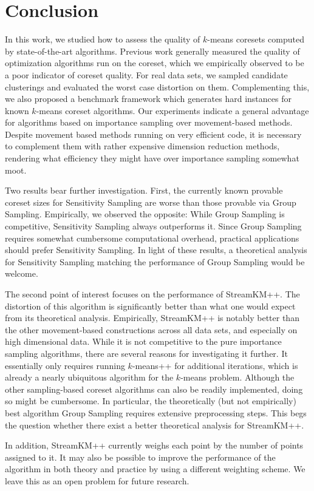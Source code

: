 \section{Conclusion} \label{sec:conclusion}
In this work, we studied how to assess the quality of $k$-means coresets computed by state-of-the-art algorithms. 
Previous work generally measured the quality of optimization algorithms run on the coreset, which we empirically observed to be a poor indicator of coreset quality.
For real data sets, we sampled candidate clusterings and evaluated the worst case distortion on them. Complementing this, we also proposed a benchmark framework which generates hard instances for known $k$-means coreset algorithms. Our experiments indicate a general advantage for algorithms based on importance sampling over movement-based methods. Despite movement based methods running on very efficient code, it is necessary to complement them with rather expensive dimension reduction methods, rendering what efficiency they might have over importance sampling somewhat moot.

Two results bear further investigation. First, the currently known provable coreset sizes for Sensitivity Sampling are worse than those provable via Group Sampling. Empirically, we observed the opposite: While Group Sampling is competitive, Sensitivity Sampling always outperforms it. Since Group Sampling requires somewhat cumbersome computational overhead, practical applications should prefer Sensitivity Sampling. In light of these results, a theoretical analysis for Sensitivity Sampling matching the performance of Group Sampling would be welcome.

The second point of interest focuses on the performance of StreamKM++. The distortion of this algorithm is significantly better than what one would expect from its theoretical analysis.
Empirically, StreamKM++ is notably better than the other movement-based constructions across all data sets, and especially on high dimensional data.
While it is not competitive to the pure importance sampling algorithms, there are several reasons for investigating it further. It essentially only requires running $k$-means++ for additional iterations, which is already a nearly ubiquitous algorithm for the $k$-means problem. Although the other sampling-based coreset algorithms can also be readily implemented, doing so might be cumbersome. In particular, the theoretically (but not empirically) best algorithm Group Sampling requires extensive preprocessing steps.
This begs the question whether there exist a better theoretical analysis for StreamKM++.

In addition, StreamKM++ currently weighs each point by the number of points assigned to it. It may also be possible to improve the performance of the algorithm in both theory and practice by using a different weighting scheme. 
We leave this as an open problem for future research.
